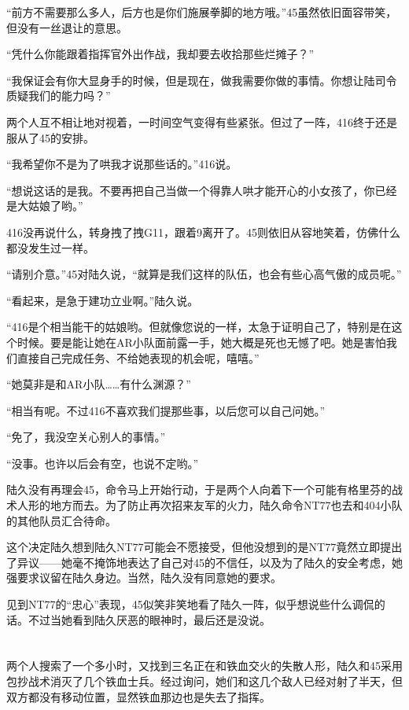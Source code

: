 “前方不需要那么多人，后方也是你们施展拳脚的地方哦。”45虽然依旧面容带笑，但没有一丝退让的意思。

“凭什么你能跟着指挥官外出作战，我却要去收拾那些烂摊子？”

“我保证会有你大显身手的时候，但是现在，做我需要你做的事情。你想让陆司令质疑我们的能力吗？”

两个人互不相让地对视着，一时间空气变得有些紧张。但过了一阵，416终于还是服从了45的安排。

“我希望你不是为了哄我才说那些话的。”416说。

“想说这话的是我。不要再把自己当做一个得靠人哄才能开心的小女孩了，你已经是大姑娘了哟。”

416没再说什么，转身拽了拽G11，跟着9离开了。45则依旧从容地笑着，仿佛什么都没发生过一样。

“请别介意。”45对陆久说，“就算是我们这样的队伍，也会有些心高气傲的成员呢。”

“看起来，是急于建功立业啊。”陆久说。

“416是个相当能干的姑娘哟。但就像您说的一样，太急于证明自己了，特别是在这个时候。要是能让她在AR小队面前露一手，她大概是死也无憾了吧。她是害怕我们直接自己完成任务、不给她表现的机会呢，嘻嘻。”

“她莫非是和AR小队……有什么渊源？”

“相当有呢。不过416不喜欢我们提那些事，以后您可以自己问她。”

“免了，我没空关心别人的事情。”

“没事。也许以后会有空，也说不定哟。”

陆久没有再理会45，命令马上开始行动，于是两个人向着下一个可能有格里芬的战术人形的地方而去。为了防止再次招来友军的火力，陆久命令NT77也去和404小队的其他队员汇合待命。

这个决定陆久想到陆久NT77可能会不愿接受，但他没想到的是NT77竟然立即提出了异议——她毫不掩饰地表达了自己对45的不信任，以及为了陆久的安全考虑，她强要求议留在陆久身边。当然，陆久没有同意她的要求。

见到NT77的“忠心”表现，45似笑非笑地看了陆久一阵，似乎想说些什么调侃的话。不过当她看到陆久厌恶的眼神时，最后还是没说。

\section*{}

两个人搜索了一个多小时，又找到三名正在和铁血交火的失散人形，陆久和45采用包抄战术消灭了几个铁血士兵。经过询问，她们和这几个敌人已经对射了半天，但双方都没有移动位置，显然铁血那边也是失去了指挥。

